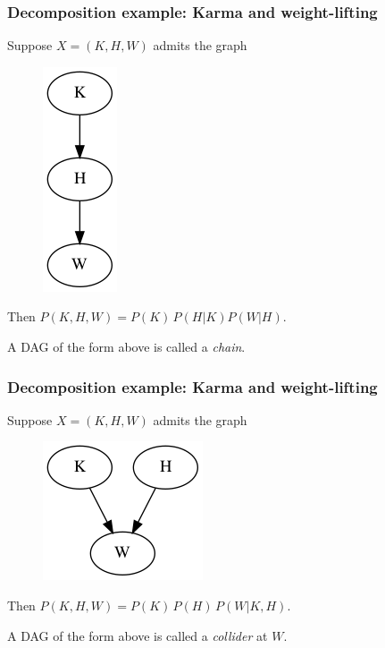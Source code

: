 \begin{frame}
\frametitle{Decomposition example: Karma and weight-lifting} 
Suppose $X = (K, H, W)$ admits the graph
\begin{figure}[ht]
  \centering
  \includegraphics[height=0.5\textheight]{graphics/karma_chain}
\end{figure}

Then $P(K, H, W) = P(K) \, P(H | K) P(W | H) $.

\begin{definition}
A DAG of the form above is called a \emph{chain}.
\end{definition}
\end{frame}


\begin{frame}
  \frametitle{Decomposition example: Karma and weight-lifting} 
  Suppose $X = (K, H, W)$ admits the graph
  \begin{figure}[ht]
    \centering
    \includegraphics[height=0.5\textheight]{graphics/karma_collider}
  \end{figure}
  
  Then $P(K, H, W) = P(K) \, P(H) \, P(W | K, H)$.
  \begin{definition}
A DAG of the form above is called a \emph{collider} at $W$.
  \end{definition}
\end{frame}


